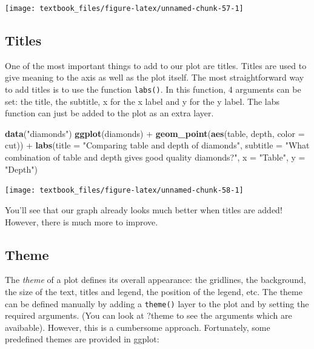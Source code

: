 \documentclass[]{tufte-book}
\newenvironment{Shaded}{}{}
\newcommand{\DataTypeTok}[1]{\textcolor[rgb]{0.56,0.13,0.00}{#1}}
\newcommand{\KeywordTok}[1]{\textcolor[rgb]{0.00,0.44,0.13}{\textbf{#1}}}
\newcommand{\NormalTok}[1]{#1}
\newcommand{\OperatorTok}[1]{\textcolor[rgb]{0.40,0.40,0.40}{#1}}
\newcommand{\StringTok}[1]{\textcolor[rgb]{0.25,0.44,0.63}{#1}}
\begin{document}
\texttt{[image: textbook\_files/figure-latex/unnamed-chunk-57-1]}

\hypertarget{titles}{%
\subsection{Titles}\label{titles}}

One of the most important things to add to our plot are titles. Titles are used to give meaning to the axis as well as the plot itself. The most straightforward way to add titles is to use the function \texttt{labs()}. In this function, 4 arguments can be set: the title, the subtitle, x for the x label and y for the y label. The labs function can just be added to the plot as an extra layer.

\begin{Shaded}
\begin{Highlighting}[]
\KeywordTok{data}\NormalTok{(}\StringTok{"diamonds"}\NormalTok{)}
\KeywordTok{ggplot}\NormalTok{(diamonds) }\OperatorTok{+}
\StringTok{    }\KeywordTok{geom_point}\NormalTok{(}\KeywordTok{aes}\NormalTok{(table, depth, }\DataTypeTok{color =}\NormalTok{ cut)) }\OperatorTok{+}\StringTok{ }
\StringTok{    }\KeywordTok{labs}\NormalTok{(}\DataTypeTok{title =} \StringTok{"Comparing table and depth of diamonds"}\NormalTok{,}
         \DataTypeTok{subtitle =} \StringTok{"What combination of table and depth gives good quality diamonds?"}\NormalTok{,}
         \DataTypeTok{x =} \StringTok{"Table"}\NormalTok{,}
         \DataTypeTok{y =} \StringTok{"Depth"}\NormalTok{)}
\end{Highlighting}
\end{Shaded}

\texttt{[image: textbook\_files/figure-latex/unnamed-chunk-58-1]}

You'll see that our graph already looks much better when titles are added! However, there is much more to improve.

\hypertarget{theme}{%
\subsection{Theme}\label{theme}}

The \emph{theme} of a plot defines its overall appearance: the gridlines, the background, the size of the text, titles and legend, the position of the legend, etc. The theme can be defined manually by adding a \texttt{theme()} layer to the plot and by setting the required arguments. (You can look at ?theme to see the arguments which are avaibable). However, this is a cumbersome approach. Fortunately, some predefined themes are provided in ggplot:
\end{document}
